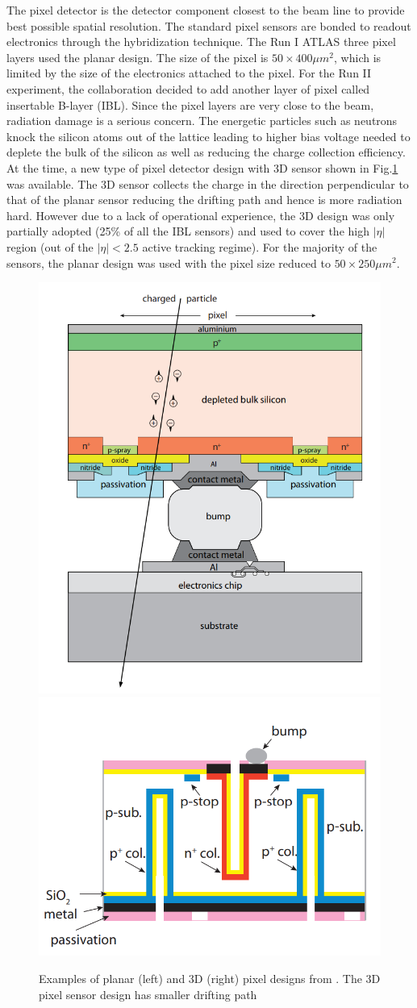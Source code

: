 The pixel detector is the detector component closest to the beam line to provide best possible spatial resolution. The standard pixel sensors are bonded to readout electronics through the hybridization technique. The Run I ATLAS three pixel layers used the planar design. The size of the pixel is $50\times 400 \mu m^2$, which is limited by the size of the electronics attached to the pixel. For the Run II experiment, the collaboration decided to add another layer of pixel called insertable B-layer (IBL)\cite{CERN-LHCC-2010-013}. Since the pixel layers are very close to the beam, radiation damage is a serious concern. The energetic particles such as neutrons knock the silicon atoms out of the lattice leading to higher bias voltage needed to deplete the bulk of the silicon as well as reducing the charge collection efficiency. At the time, a new type of pixel detector design with 3D sensor shown in Fig.\ref{fig:detector-sensor} was available. The 3D sensor collects the charge in the direction perpendicular to that of the planar sensor reducing the drifting path and hence is more radiation hard. However due to a lack of operational experience, the 3D design was only partially adopted (25\% of all the IBL sensors) and used to cover the high $|\eta|$ region (out of the $|\eta|<2.5$ active tracking regime). For the majority of the sensors, the planar design was used with the pixel size reduced to $50\times 250\mu m^2$. 

\begin{figure}[htpb!]
\begin{center}
  \includegraphics[width=0.35\linewidth]{figures/detector/PixelPlanar}
  \includegraphics[width=0.40\linewidth]{figures/detector/Pixel3D}
\caption{Examples of planar (left) and 3D (right) pixel designs from \cite{PixReview}. The 3D pixel sensor design has smaller drifting path }
\label{fig:detector-sensor}
\end{center}
\end{figure}


